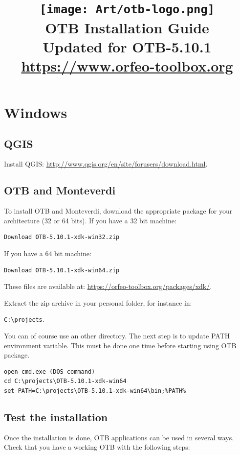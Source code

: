 \documentclass[10pt,a4paper]{article}
\title{\texttt{[image: Art/otb-logo.png]}\\
  OTB Installation Guide\\
  Updated for OTB-5.10.1\\
  {\small\url{https://www.orfeo-toolbox.org}}
}
\begin{document}
\maketitle

\tableofcontents

\clearpage

\section{Windows}

\subsection{QGIS}
Install QGIS: \url{http://www.qgis.org/en/site/forusers/download.html}.

\subsection{OTB and Monteverdi}

To install OTB and Monteverdi, download the appropriate package for your
architecture (32 or 64 bits). If you have a 32 bit machine:

\begin{verbatim}
Download OTB-5.10.1-xdk-win32.zip
\end{verbatim}

If you have a 64 bit machine:

\begin{verbatim}
Download OTB-5.10.1-xdk-win64.zip
\end{verbatim}

These files are available at:
\url{https://orfeo-toolbox.org/packages/xdk/}.

Extract the zip archive in your personal folder, for instance in:\\
\begin{centering}
\texttt{C:{\textbackslash}projects}.
\end{centering}

You can of course use an other directory. The next step is to update PATH
environment variable. This must be done one time before starting using OTB package.

\begin{verbatim}
open cmd.exe (DOS command)
cd C:\projects\OTB-5.10.1-xdk-win64
set PATH=C:\projects\OTB-5.10.1-xdk-win64\bin;%PATH%
\end{verbatim}

\subsection{Test the installation}
Once the installation is done, OTB applications can be used in several
ways. Check that you have a working OTB with the following steps:
\end{document}
